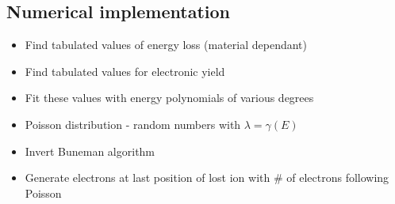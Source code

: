 \subsection{Numerical implementation}
\begin{itemize}
\item{Find tabulated values of energy loss (material dependant)}
\item{Find tabulated values for electronic yield}
\item{Fit these values with energy polynomials of various degrees}
\item{Poisson distribution - random numbers with $\lambda=\gamma(E)$}
\item{Invert Buneman algorithm}
\item{Generate electrons at last position of lost ion with \# of electrons following Poisson}
\end{itemize}
